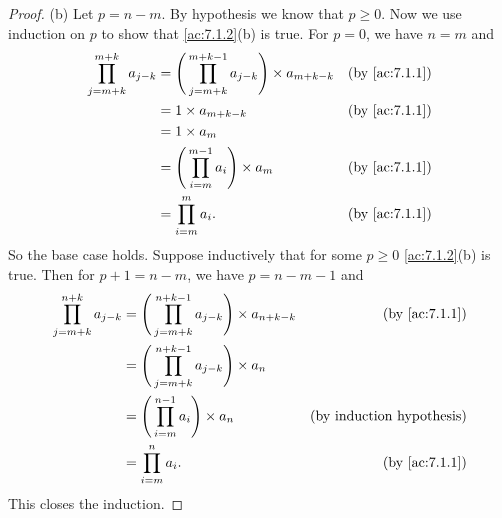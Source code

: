 \begin{proof}{(b)}
  Let \(p = n - m\).
  By hypothesis we know that \(p \geq 0\).
  Now we use induction on \(p\) to show that \cref{ac:7.1.2}(b) is true.
  For \(p = 0\), we have \(n = m\) and
  \begin{align*}
    \prod_{j = m + k}^{m + k} a_{j - k} & = \Bigg(\prod_{j = m + k}^{m + k - 1} a_{j - k}\Bigg) \times a_{m + k - k} & \text{(by \cref{ac:7.1.1})} \\
                                        & = 1 \times a_{m + k - k}                                                   & \text{(by \cref{ac:7.1.1})} \\
                                        & = 1 \times a_m                                                                                           \\
                                        & = \Bigg(\prod_{i = m}^{m - 1} a_i\Bigg) \times a_m                         & \text{(by \cref{ac:7.1.1})} \\
                                        & = \prod_{i = m}^m a_i.                                                     & \text{(by \cref{ac:7.1.1})}
  \end{align*}
  So the base case holds.
  Suppose inductively that for some \(p \geq 0\) \cref{ac:7.1.2}(b) is true.
  Then for \(p + 1 = n - m\), we have \(p = n - m - 1\) and
  \begin{align*}
    \prod_{j = m + k}^{n + k} a_{j - k} & = \Bigg(\prod_{j = m + k}^{n + k - 1} a_{j - k}\Bigg) \times a_{n + k - k} & \text{(by \cref{ac:7.1.1})}      \\
                                        & = \Bigg(\prod_{j = m + k}^{n + k - 1} a_{j - k}\Bigg) \times a_n                                              \\
                                        & = \Bigg(\prod_{i = m}^{n - 1} a_i\Bigg) \times a_n                         & \text{(by induction hypothesis)} \\
                                        & = \prod_{i = m}^n a_i.                                                     & \text{(by \cref{ac:7.1.1})}
  \end{align*}
  This closes the induction.
\end{proof}

